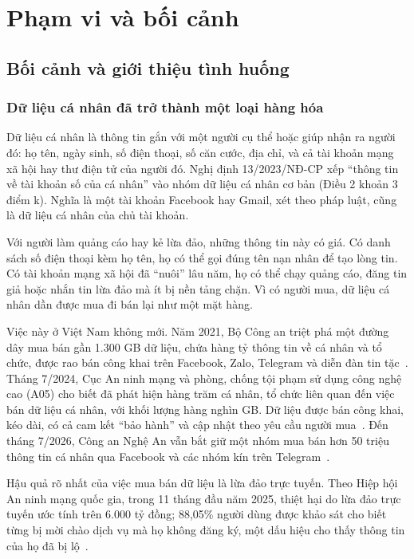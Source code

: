 \section{Phạm vi và bối cảnh}\label{sec:1}

\subsection{Bối cảnh và giới thiệu tình huống}\label{sec:1.1}

\subsubsection{Dữ liệu cá nhân đã trở thành một loại hàng hóa}\label{sec:1.1.1}

Dữ liệu cá nhân là thông tin gắn với một người cụ thể hoặc giúp nhận ra người đó: họ tên, ngày sinh, số điện thoại, số căn cước, địa chỉ, và cả tài khoản mạng xã hội hay thư điện tử của người đó. Nghị định 13/2023/NĐ-CP xếp “thông tin về tài khoản số của cá nhân” vào nhóm dữ liệu cá nhân cơ bản (Điều 2 khoản 3 điểm k). Nghĩa là một tài khoản Facebook hay Gmail, xét theo pháp luật, cũng là dữ liệu cá nhân của chủ tài khoản.

Với người làm quảng cáo hay kẻ lừa đảo, những thông tin này có giá. Có danh sách số điện thoại kèm họ tên, họ có thể gọi đúng tên nạn nhân để tạo lòng tin. Có tài khoản mạng xã hội đã “nuôi” lâu năm, họ có thể chạy quảng cáo, đăng tin giả hoặc nhắn tin lừa đảo mà ít bị nền tảng chặn. Vì có người mua, dữ liệu cá nhân dần được mua đi bán lại như một mặt hàng.

Việc này ở Việt Nam không mới. Năm 2021, Bộ Công an triệt phá một đường dây mua bán gần 1.300 GB dữ liệu, chứa hàng tỷ thông tin về cá nhân và tổ chức, được rao bán công khai trên Facebook, Zalo, Telegram và diễn đàn tin tặc~\cite{sggp-2021}. Tháng 7/2024, Cục An ninh mạng và phòng, chống tội phạm sử dụng công nghệ cao (A05) cho biết đã phát hiện hàng trăm cá nhân, tổ chức liên quan đến việc bán dữ liệu cá nhân, với khối lượng hàng nghìn GB. Dữ liệu được bán công khai, kéo dài, có cả cam kết “bảo hành” và cập nhật theo yêu cầu người mua~\cite{vneconomy-2024}. Đến tháng 7/2026, Công an Nghệ An vẫn bắt giữ một nhóm mua bán hơn 50 triệu thông tin cá nhân qua Facebook và các nhóm kín trên Telegram~\cite{sggp-2026-50trieu}.

Hậu quả rõ nhất của việc mua bán dữ liệu là lừa đảo trực tuyến. Theo Hiệp hội An ninh mạng quốc gia, trong 11 tháng đầu năm 2025, thiệt hại do lừa đảo trực tuyến ước tính trên 6.000 tỷ đồng; 88,05\% người dùng được khảo sát cho biết từng bị mời chào dịch vụ mà họ không đăng ký, một dấu hiệu cho thấy thông tin của họ đã bị lộ~\cite{sggp-2026-thiethai}.

